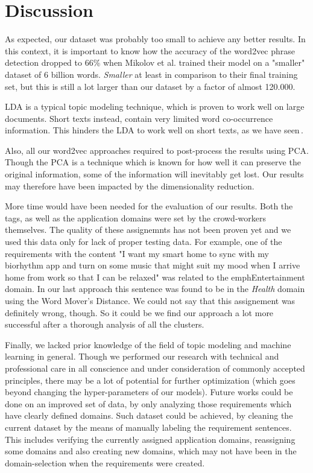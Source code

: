 \section{Discussion}
\label{sec:discussion}
As expected, our dataset was probably too small to achieve any better results. In this context, it is important to know how the accuracy of the word2vec phrase detection dropped to 66\% when Mikolov et al. trained their model on a "smaller" dataset of 6 billion words\cite[p7]{mikolov_distributed_2013}. \emph{Smaller} at least in comparison to their final training set, but this is still a lot larger than our dataset by a factor of almost 120.000.

LDA is a typical topic modeling technique, which is proven to work well on large documents. Short texts instead, contain very limited word co-occurrence information. This hinders the LDA to work well on short texts, as we have seen\,\cite{quan_short_2015}.

Also, all our word2vec approaches required to post-process the results using PCA. Though the PCA is a technique which is known for how well it can preserve the original information, some of the information will inevitably get lost. Our results may therefore have been impacted by the dimensionality reduction.

More time would have been needed for the evaluation of our results. Both the tags, as well as the application domains were set by the crowd-workers themselves. The quality of these assignemnts has not been proven yet and we used this data only for lack of proper testing data. For example, one of the requirements with the content "I want my smart home to sync with my biorhythm app and turn on some music that might suit my mood when I arrive home from work so that I can be relaxed" was related to the emph{Entertainment} domain. In our last approach this sentence was found to be in the \emph{Health} domain using the Word Mover's Distance. We could not say that this assignement was definitely wrong, though. So it could be we find our approach a lot more successful after a thorough analysis of all the clusters.

Finally, we lacked prior knowledge of the field of topic modeling and machine learning in general. Though we performed our research with technical and professional care in all conscience and under consideration of commonly accepted principles, there may be a lot of potential for further optimization (which goes beyond changing the hyper-parameters of our models). Future works could be done on an improved set of data, by only analyzing those requirements which have clearly defined domains. Such dataset could be achieved, by cleaning the current \crowdre{} dataset by the means of manually labeling the requirement sentences. This includes verifying the currently assigned application domains, reassigning some domains and also creating new domains, which may not have been in the domain-selection when the requirements were created.\\

